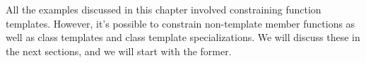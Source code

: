 All the examples discussed in this chapter involved constraining function templates. However, it’s possible to constrain non-template member functions as well as class templates and class template specializations. We will discuss these in the next sections, and we will start with the former.





























